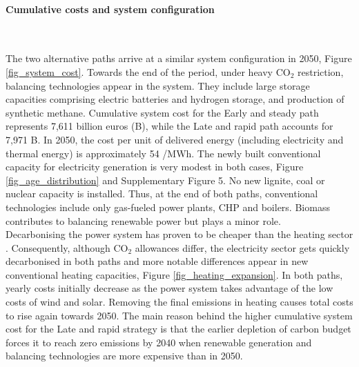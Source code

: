 \documentclass[5p]{elsarticle} %
\begin{document}
\paragraph{\textbf{Cumulative costs and system configuration}} \

The two alternative paths arrive at a similar system configuration in 2050, Figure \ref{fig_system_cost}. Towards the end of the period, under heavy CO$_2$ restriction, balancing technologies appear in the system. They include large storage capacities comprising electric batteries and hydrogen storage, and production of synthetic methane.  Cumulative system cost for the Early and steady path represents 7,611 billion euros (B\EUR), while the Late and rapid path accounts for 7,971 B\EUR. In 2050, the cost per unit of delivered energy (including electricity and thermal energy) is approximately 54 \EUR /MWh. The newly built conventional capacity for electricity generation is very modest in both cases, Figure \ref{fig_age_distribution} and Supplementary Figure 5. No new lignite, coal or nuclear capacity is installed. Thus, at the end of both paths, conventional technologies include only gas-fueled power plants, CHP and boilers. Biomass contributes to balancing renewable power but plays a minor role. \\

Decarbonising the power system has proven to be cheaper than the heating sector \cite{Zhu_2019}. Consequently, although CO$_2$ allowances differ, the electricity sector gets quickly decarbonised in both paths and more notable differences appear in new conventional heating capacities, Figure \ref{fig_heating_expansion}. In both paths, yearly costs initially decrease as the power system takes advantage of the low costs of wind and solar. Removing the final emissions in heating causes total costs to rise again towards 2050. The main reason behind the higher cumulative system cost for the Late and rapid strategy is that the earlier depletion of carbon budget forces it to reach zero emissions by 2040 when renewable generation and balancing technologies are more expensive than in 2050.
\end{document}
